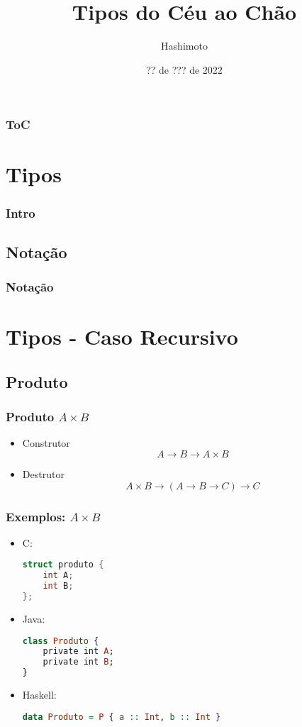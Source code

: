 \documentclass{beamer}
\title{Tipos do Céu ao Chão}
\author{Hashimoto}
\date{?? de ??? de 2022}
\begin{document}
\begin{frame}
    \titlepage
\end{frame}

\begin{frame}
    \frametitle{ToC}
    \tableofcontents[hideallsubsections]
\end{frame}

\section{Tipos}
\begin{frame}
    \frametitle{Intro}
\end{frame}

\subsection{Notação}
\begin{frame}
    \frametitle{Notação}
\end{frame}

\section{Tipos - Caso Recursivo}
\subsection{Produto}
\begin{frame}
    \frametitle{Produto \(A \times B\)}
    \begin{itemize}
        \item Construtor
            \[
                A \to B \to A \times B
            \]
        \item Destrutor
            \[
                A \times B \to (A \to B \to C) \to C
            \]
    \end{itemize}
\end{frame}

\begin{frame}[fragile]
    \frametitle{Exemplos: \(A \times B\)}
    \begin{itemize}
        \item C:
        \begin{lstlisting}[language=C]
struct produto {
    int A;
    int B;
};
        \end{lstlisting}
        \item Java:
        \begin{lstlisting}[language=Haskell]
class Produto {
    private int A;
    private int B;
}
        \end{lstlisting}
        \item Haskell:
        \begin{lstlisting}[language=Haskell]
data Produto = P { a :: Int, b :: Int }
        \end{lstlisting}
    \end{itemize}
\end{frame}
\end{document}
